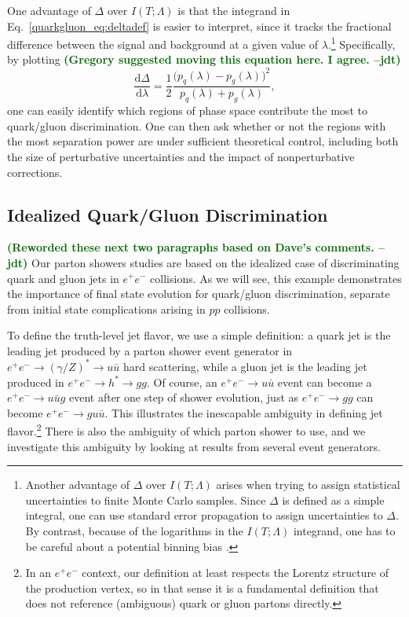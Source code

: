 \documentclass[11pt]{cernrep}
\newcommand{\jdt}[1]{\textbf{\textcolor{darkgreen}{(#1 --jdt)}}}
\begin{document}
One advantage of $\Delta$ over $I(T;\Lambda)$ is that the integrand in Eq.~\eqref{quarkgluon_eq:deltadef} is easier to interpret, since it tracks the fractional difference between the signal and background at a given value of $\lambda$.\footnote{Another advantage of $\Delta$ over $I(T; \Lambda)$ arises when trying to assign statistical uncertainties to finite Monte Carlo samples.  Since $\Delta$ is defined as a simple integral, one can use standard error propagation to assign uncertainties to $\Delta$.  By contrast, because of the logarithms in the $I(T; \Lambda)$ integrand, one has to be careful about a potential binning bias \cite{Larkoski:2014pca}.}  Specifically, by plotting \jdt{Gregory suggested moving this equation here.  I agree.}
\begin{equation}
\label{quarkgluon_eq:deltaintegrand}
\frac{\text{d} \Delta}{\text{d} \lambda} = \frac{1}{2} \frac{\bigl(p_q(\lambda) - p_g(\lambda) \bigr)^2}{p_q(\lambda) + p_g(\lambda)},
\end{equation}
one can easily identify which regions of phase space contribute the most to quark/gluon discrimination.  One can then ask whether or not the regions with the most separation power are under sufficient theoretical control, including both the size of perturbative uncertainties and the impact of nonperturbative corrections.  

\subsection{Idealized Quark/Gluon Discrimination}
\label{quarkgluon_sec:ee}

\jdt{Reworded these next two paragraphs based on Dave's comments.}  Our parton showers studies are based on the idealized case of discriminating quark and gluon jets in $e^+ e^-$ collisions.  As we will see, this example demonstrates the importance of final state evolution for quark/gluon discrimination, separate from initial state complications arising in $pp$ collisions.  

To define the truth-level jet flavor, we use a simple definition:  a quark jet is the leading jet produced by a parton shower event generator in $e^+ e^- \to (\gamma/Z)^* \to u \bar{u}$ hard scattering, while a gluon jet is the leading jet produced in $e^+ e^- \to h^* \to gg$.  Of course, an $e^+e^- \to u \bar u$ event can become a $e^+e^- \to u \bar u g$ event after one step of shower evolution, just as $e^+e^- \to g g$ can become $e^+e^- \to g u \bar u$.  This illustrates the inescapable ambiguity in defining jet flavor.\footnote{In an $e^+e^-$ context, our definition at least respects the Lorentz structure of the production vertex, so in that sense it is a fundamental definition that does not reference (ambiguous) quark or gluon partons directly.}  There is also the ambiguity of which parton shower to use, and we investigate this ambiguity by looking at results from several event generators.
\end{document}
